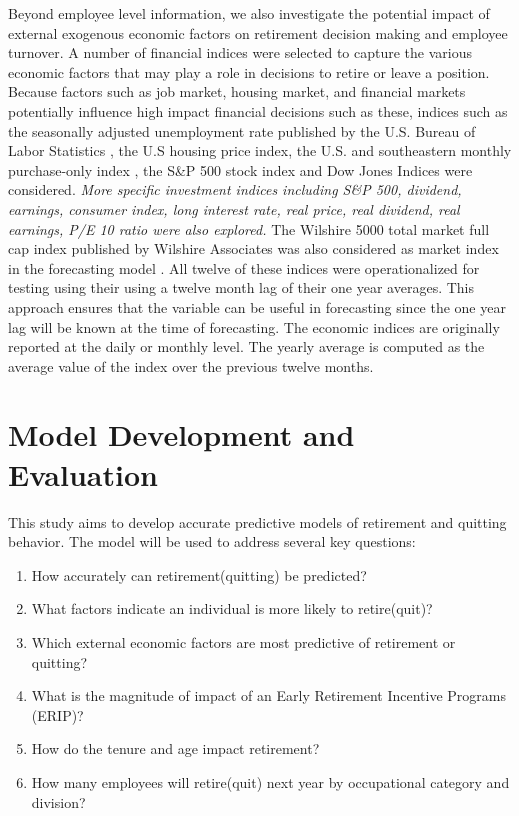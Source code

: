\documentclass[12pt,letterpaper]{article}
\begin{document}
Beyond employee level information, we also investigate the potential impact of external exogenous economic factors on retirement decision making and employee turnover.  A number of financial indices were selected to capture the various economic factors that may play a role in decisions to retire or leave a position.  Because factors such as job market, housing market, and financial markets potentially influence high impact financial decisions such as these, indices such as the seasonally adjusted unemployment rate published by the U.S. Bureau of Labor Statistics \citep{unemployment}, the U.S housing price index, the U.S. and southeastern monthly purchase-only index \citep{HPI}, the S\&P 500 stock index and Dow Jones Indices were considered. {\it More specific investment indices including S\&P 500, dividend, earnings, consumer index, long interest rate, real price, real dividend, real earnings, P/E 10 ratio were also explored\citep{sp500}.} The Wilshire 5000 total market full cap index published by Wilshire Associates was also considered as market index in the forecasting model \citep{will5000}. All twelve of these indices were operationalized for testing using their using a twelve month lag of their one year averages.  This approach ensures that the variable can be useful in forecasting since the one year lag will be known at the time of forecasting.  The economic indices are originally reported at the daily or monthly level. The yearly average is computed as the average value of the index over the previous twelve months.


\section{Model Development and Evaluation}
This study aims to develop accurate predictive models of retirement and quitting behavior. The model will be used to address several key questions:
\begin{enumerate}
\item How accurately can retirement(quitting) be predicted?
\item What factors indicate an individual is more likely to retire(quit)?
\item Which external economic factors are most predictive of retirement or quitting?
\item What is the magnitude  of impact of an Early Retirement Incentive Programs (ERIP)?
\item How do the tenure and age impact retirement?
\item How many employees will retire(quit) next year by occupational category and division?
\end{enumerate}
\end{document}
